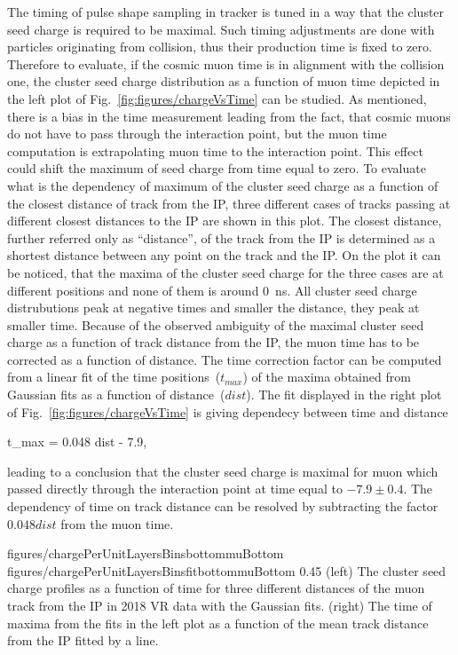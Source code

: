 The timing of pulse shape sampling in tracker is tuned in a way that the cluster seed charge is required to be maximal. Such timing adjustments are done with particles originating from collision, thus their production time is fixed to zero. Therefore to evaluate, if the cosmic muon time is in alignment with the collision one, the cluster seed charge distribution as a function of muon time depicted in the left plot of Fig.~\ref{fig:figures/chargeVsTime} can be studied. As mentioned, there is a bias in the time measurement leading from the fact, that cosmic muons do not have to pass through the interaction point, but the muon time computation is extrapolating muon time to the interaction point. This effect could shift the maximum of seed charge from time equal to zero. To evaluate what is the dependency of maximum of the cluster seed charge as a function of the closest distance of track from the IP, three different cases of tracks passing at different closest distances to the IP are shown in this plot. The closest distance, further referred only as ``distance'', of the track from the IP  is determined as a shortest distance between any point on the track and the IP. On the plot it can be noticed, that the maxima of the cluster seed charge for the three cases are at different positions and none of them is around 0~ns. All cluster seed charge distrubutions peak at negative times and smaller the distance, they peak at smaller time. Because of the observed ambiguity of the maximal cluster seed charge as a function of track distance from the IP, the muon time has to be corrected as a function of distance. The time correction factor can be computed from a linear fit of the time positions~($t_{max}$) of the maxima obtained from Gaussian fits as a function of distance~($dist$). The fit displayed in the right plot of Fig.~\ref{fig:figures/chargeVsTime} is giving dependecy between time and distance

{
t_{max} = 0.048 dist  - 7.9,
}

leading to a conclusion that the cluster seed charge is maximal for muon which passed directly through the interaction point at time equal to $-7.9 \pm 0.4 $. The dependency of time on track distance can be resolved by subtracting the factor $ 0.048 dist $ from the muon time.


                 {figures/chargePerUnitLayersBinsbottommuBottom}
                 {figures/chargePerUnitLayersBinsfitbottommuBottom}
                 {0.45}       %
                 {(left) The cluster seed charge profiles as a function of time for three different distances of the muon track from the IP in 2018 VR data with the Gaussian fits. (right) The time of maxima from the fits in the left plot as a function of the mean track distance from the IP fitted by a line. }

